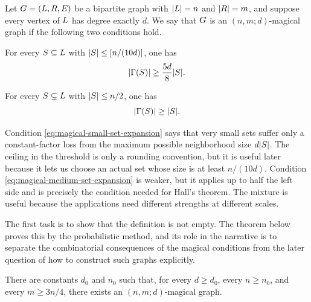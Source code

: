 \begin{definition}
	\label{def:magical-bipartite-graph}
	Let \(G=(L,R,E)\) be a bipartite graph with \(\lvert L\rvert=n\) and \(\lvert R\rvert=m\), and suppose every vertex of \(L\) has degree exactly \(d\). We say that \(G\) is an \((n,m;d)\)-magical graph if the following two conditions hold.
	\begin{compactenum}
		\item For every \(S\subseteq L\) with \(\lvert S\rvert\leq [ n/(10d)]\), one has
		\begin{equation}
			\label{eq:magical-small-set-expansion}
			\lvert\Gamma(S)\rvert\geq \frac{5d}{8}\lvert S\rvert.
		\end{equation}
		\item For every \(S\subseteq L\) with \(\lvert S\rvert\leq n/2\), one has
		\begin{equation}
			\label{eq:magical-medium-set-expansion}
			\lvert\Gamma(S)\rvert\geq \lvert S\rvert.
		\end{equation}
	\end{compactenum}
\end{definition}

Condition \cref{eq:magical-small-set-expansion} says that very small sets suffer only a constant-factor loss from the maximum possible neighborhood size \(d\lvert S\rvert\). The ceiling in the threshold is only a rounding convention, but it is useful later because it lets us choose an actual set whose size is at least \(n/(10d)\). Condition \cref{eq:magical-medium-set-expansion} is weaker, but it applies up to half the left side and is precisely the condition needed for Hall's theorem. The mixture is useful because the applications need different strengths at different scales.

The first task is to show that the definition is not empty. The theorem below proves this by the probabilistic method, and its role in the narrative is to separate the combinatorial consequences of the magical conditions from the later question of how to construct such graphs explicitly.

\begin{theorem}
	\label{thm:magical-graphs-exist}
	There are constants \(d_0\) and \(n_0\) such that, for every \(d\geq d_0\), every \(n\geq n_0\), and every \(m\geq 3n/4\), there exists an \((n,m;d)\)-magical graph.
\end{theorem}

